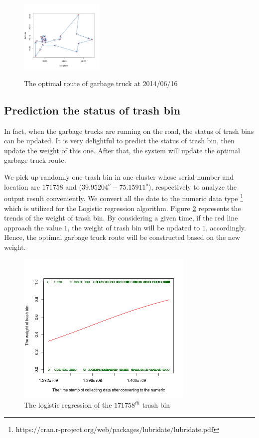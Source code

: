 \documentclass[conference,compsoc]{IEEEtran}
\begin{document}
\begin{figure}
	\begin{minipage}{3cm}
		\includegraphics[width=4cm]{Cluster5}
		
		\label{fig1b}
	\end{minipage}
	\caption{The optimal route of garbage truck at 2014/06/16}
	\label{fig5}
	
\end{figure}
\subsection{Prediction the status of trash bin} 

In fact, when the garbage trucks are running on the road, the status of trash bins can be updated. It is very delightful to predict the status of trash bin, then update the weight of this one. After that, the system will update the optimal garbage truck route. 

We pick up randomly one trash bin in one cluster whose serial number and location are $171758$ and ($39.95204^o -75.15911^o$), respectively to analyze the output result conveniently. We convert all the date to the numeric data type \footnote{https://cran.r-project.org/web/packages/lubridate/lubridate.pdf} which is utilized for the Logistic regression algorithm. Figure \ref{fig6} represents the trends of the weight of trash bin. By considering a given time, if the red line approach the value $1$, the weight of trash bin will be updated to $1$, accordingly. Hence, the optimal garbage truck route will be constructed based on the new weight.

  \begin{figure}
	\centering
	\includegraphics[width=8.5cm]{regression}
	\caption{The logistic regression of the $171758^{th}$ trash bin}
	\label{fig6}
\end{figure}
\end{document}
